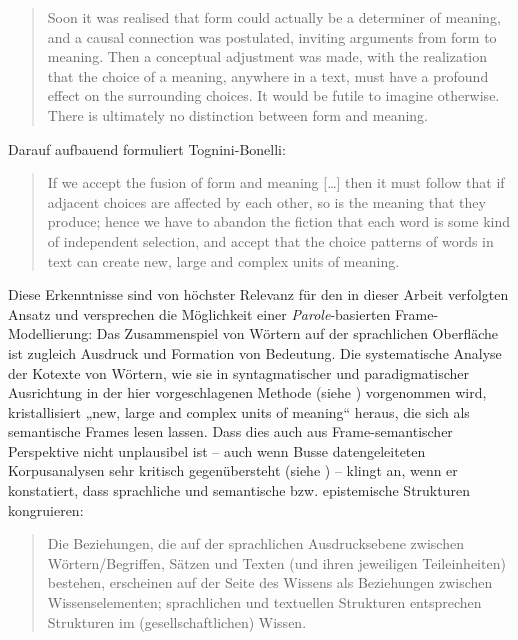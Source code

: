 \begin{quote}
Soon it was realised that form could actually be a determiner of meaning, and a causal connection was postulated, inviting arguments from form to meaning. Then a conceptual adjustment was made, with the realization that the choice of a meaning, anywhere in a text, must have a profound effect on the surrounding choices. It would be futile to imagine otherwise. There is ultimately no distinction between form and meaning. \autocite[7]{sinclairCorpusConcordanceCollocation1991}
\end{quote}

Darauf aufbauend formuliert Tognini-Bonelli:

\begin{quote}
If we accept the fusion of form and meaning {[}\ldots{]} then it must follow that if adjacent choices are affected by each other, so is the meaning that they produce; hence we have to abandon the fiction that each word is some kind of independent selection, and accept that the choice patterns of words in text can create new, large and complex units of meaning. \autocite[102]{tognini-bonelliCorpusLinguisticsWork2001}
\end{quote}

Diese Erkenntnisse sind von höchster Relevanz für den in dieser Arbeit verfolgten Ansatz und versprechen die Möglichkeit einer \emph{Parole}-basierten Frame-Modellierung: Das Zusammenspiel von Wörtern auf der sprachlichen Oberfläche ist zugleich Ausdruck und Formation von Bedeutung. Die systematische Analyse der Kotexte von Wörtern, wie sie in syntagmatischer und paradigmatischer Ausrichtung in der hier vorgeschlagenen Methode (siehe ) vorgenommen wird, kristallisiert „new, large and complex units of meaning`` heraus, die sich als semantische Frames lesen lassen. Dass dies auch aus Frame-semantischer Perspektive nicht unplausibel ist -- auch wenn Busse datengeleiteten Korpusanalysen sehr kritisch gegenübersteht (siehe ) -- klingt an, wenn er konstatiert, dass sprachliche und semantische bzw. epistemische Strukturen kongruieren:

\begin{quote}
Die Beziehungen, die auf der sprachlichen Ausdrucksebene zwischen Wörtern/Begriffen, Sätzen und Texten (und ihren jeweiligen Teileinheiten) bestehen, erscheinen auf der Seite des Wissens als Beziehungen zwischen Wissenselementen; sprachlichen und textuellen Strukturen entsprechen Strukturen im (gesellschaftlichen) Wissen. \autocite[164]{busseDiskursSpracheGesellschaftliches2013}
\end{quote}

